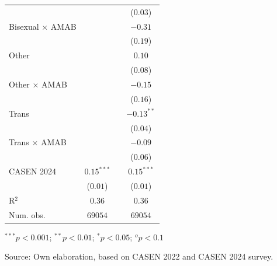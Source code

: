 \begin{table}[H]
\begin{center}
\begin{threeparttable}
\begin{tabular}{lccc}
 &  & & ($0.03$) \\ 
Bisexual $\times$ AMAB &  & & $-0.31$ \\ 
 &  & & ($0.19$) \\ 
Other &  & & $0.10$ \\ 
 &  & & ($0.08$) \\ 
Other $\times$ AMAB &  & & $-0.15$ \\ 
 &  & & ($0.16$) \\ 
Trans &  & & $-0.13^{**}$ \\ 
 &  & & ($0.04$) \\ 
Trans $\times$ AMAB &  & & $-0.09$ \\ 
 &  & & ($0.06$) \\ 
CASEN 2024 & $0.15^{***}$ & & $0.15^{***}$ \\ 
 & ($0.01$) & & ($0.01$) \\ 
R$^2$ & $0.36$ & & $0.36$ \\ 
Num. obs. & $69054$ & & $69054$ \\ \bottomrule
\end{tabular}
\begin{tablenotes}
\item ${}^{***}p<0.001$; ${}^{**}p<0.01$; ${}^{*}p<0.05$; ${}^{o}p<0.1$
\item Source: Own elaboration, based on CASEN 2022 and CASEN 2024 survey.
\end{tablenotes}
\end{threeparttable}
\end{center}
\end{table}